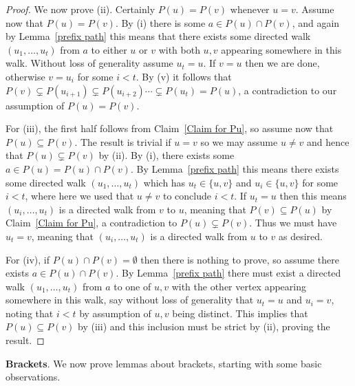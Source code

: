 \documentclass[12pt,letterpaper]{article}
\theoremstyle{definition}
\renewcommand{\1}{\mathbbm{1}}
\newcommand{\sub}{\subseteq}
\begin{document}
\begin{proof}
	We now prove (ii).  Certainly $P(u)=P(v)$ whenever $u=v$.  Assume now that $P(u)=P(v)$.  By (i) there is some $a\in P(u)\cap P(v)$, and again by Lemma~\ref{prefix path} this means that there exists some directed walk $(u_1,\ldots,u_t)$ from $a$ to either $u$ or $v$ with both $u,v$ appearing somewhere in this walk.  Without loss of generality assume $u_t=u$.  If $v=u$ then we are done, otherwise $v=u_i$ for some $i<t$.  By (v) it follows that $P(v)\subsetneq P(u_{i+1})\subsetneq P(u_{i+2})\cdots \subsetneq P(u_t)=P(u)$, a contradiction to our assumption of $P(u)=P(v)$.
	
	For (iii), the first half follows from Claim~\ref{Claim for Pu}, so assume now that $P(u)\sub P(v)$.  The result is trivial if $u=v$ so we may assume $u\ne v$ and hence that $P(u)\subsetneq P(v)$ by (ii).  By (i), there exists some $a\in P(u)=P(u)\cap P(v)$.  By Lemma~\ref{prefix path} this means there exists some directed walk $(u_1,\ldots,u_t)$ which has $u_t\in \{u,v\}$ and $u_i\in \{u,v\}$ for some $i<t$, where here we used that $u\ne v$ to conclude $i<t$.  If $u_t=u$ then this means $(u_i,\ldots,u_t)$ is a directed walk from $v$ to $u$, meaning that $P(v)\sub P(u)$ by Claim~\ref{Claim for Pu}, a contradiction to $P(u)\subsetneq P(v)$.  Thus we must have $u_t=v$, meaning that $(u_i,\ldots,u_t)$ is a directed walk from $u$ to $v$ as desired.
	
	For (iv), if $P(u)\cap P(v)=\emptyset$ then there is nothing to prove, so assume there exists $a\in P(u)\cap P(v)$.  By Lemma~\ref{prefix path} there must exist a directed walk $(u_1,\ldots,u_t)$ from $a$ to one of $u,v$ with the other vertex appearing somewhere in this walk, say without loss of generality that $u_t=u$ and $u_i=v$, noting that $i<t$ by assumption of $u,v$ being distinct.  This implies that $P(u)\sub P(v)$ by (iii) and this inclusion must be strict by (ii), proving the result.
\end{proof}


\textbf{Brackets}.   We now prove lemmas about brackets, starting with some basic observations.
\end{document}

